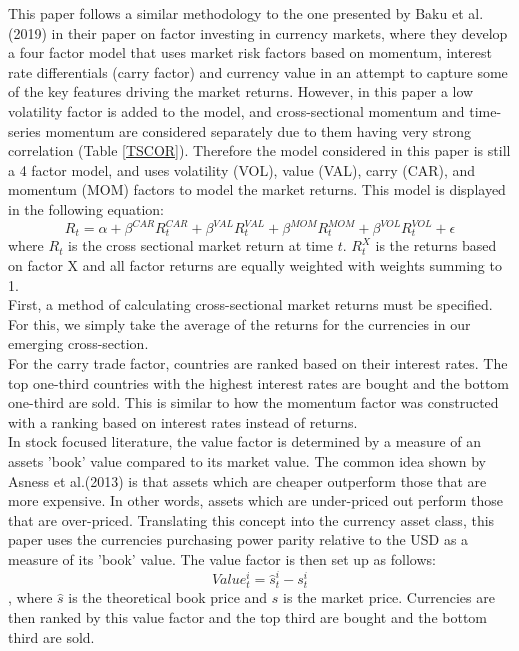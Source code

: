 \documentclass{article}
\begin{document}
This paper follows a similar methodology to the one presented by Baku et al.(2019) in their paper on factor investing in currency markets, where they develop a four factor model that uses market risk factors based on momentum, interest rate differentials (carry factor) and currency value in an attempt to capture some of the key features driving the market returns. However, in this paper a low volatility factor is added to the model, and cross-sectional momentum and time-series momentum are considered separately due to them having very strong correlation (Table \ref{TSCOR}). Therefore the model considered in this paper is still a 4 factor model, and uses volatility (VOL), value (VAL), carry (CAR), and momentum (MOM) factors to model the market returns. This model is displayed in the following equation:
$$ R_t = \alpha + \beta^{CAR} R^{CAR}_t + \beta^{VAL} R^{VAL}_t + \beta^{MOM} R^{MOM}_t + \beta^{VOL} R^{VOL}_t + \epsilon$$
where $R_t$ is the cross sectional market return at time $t$. $R^{X}_t$ is the returns based on factor X and all factor returns are equally weighted with weights summing to 1.\\

First, a method of calculating cross-sectional market returns must be specified. For this, we simply take the average of the returns for the currencies in our emerging cross-section.\\

For the carry trade factor, countries are ranked based on their interest rates. The top one-third countries with the highest interest rates are bought and the bottom one-third are sold. This is similar to how the momentum factor was constructed with a ranking based on interest rates instead of returns. \\

In stock focused literature, the value factor is determined by a measure of an assets 'book' value compared to its market value. The common idea shown by Asness et al.(2013) is that assets which are cheaper outperform those that are more expensive. In other words, assets which are under-priced out perform those that are over-priced. Translating this concept into the currency asset class, this paper uses the currencies purchasing power parity relative to the USD as a measure of its 'book' value. The value factor is then set up as follows:
$$Value^i_t = \hat{s}^i_t - s^i_t$$ , where $\hat{s}$ is the theoretical book price and $s$ is the market price. 
Currencies are then ranked by this value factor and the top third are bought and the bottom third are sold.\\
\end{document}

